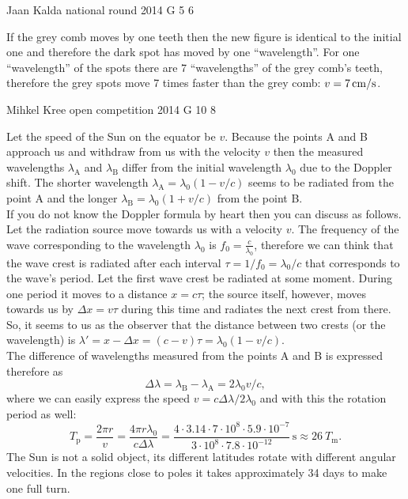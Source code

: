 \documentclass[11pt]{article}
\begin{document}
{Jaan Kalda} %
{national round} %
{2014} %
{G 5} %
{6} %
{

\ifEngSolution
If the grey comb moves by one teeth then the new figure is identical to the initial one and therefore the dark spot has moved by one “wavelength”. For one “wavelength” of the spots there are 7 “wavelengths” of the grey comb’s teeth, therefore the grey spots move 7 times faster than the grey comb: $v=\SI 7{cm/s}$.
\fi
}

{Mihkel Kree} %
{open competition} %
{2014} %
{G 10} %
{8} %
{

\ifEngSolution
Let the speed of the Sun on the equator be $v$. Because the points A and B approach us and withdraw from us with the velocity $v$ then the measured wavelengths $\lambda_\text{A}$ and $\lambda_\text{B}$ differ from the initial wavelength $\lambda_0$ due to the Doppler shift. The shorter wavelength $\lambda_\text{A}=\lambda_0(1-v/c)$ seems to be radiated from the point A and the longer $\lambda_\text{B}=\lambda_0(1+v/c)$ from the point B.\\
If you do not know the Doppler formula by heart then you can discuss as follows. Let the radiation source move towards us with a velocity $v$. The frequency of the wave corresponding to the wavelength $\lambda_0$ is $f_0=\frac{c}{\lambda_0}$, therefore we can think that the wave crest is radiated after each interval $\tau = 1/f_0 = \lambda_0/c$ that corresponds to the wave’s period. Let the first wave crest be radiated at some moment. During one period it moves to a distance $x=c\tau$; the source itself, however, moves towards us by $\Delta x = v\tau$ during this time and radiates the next crest from there. So, it seems to us as the observer that the distance between two crests (or the wavelength) is $\lambda'=x-\Delta x=(c-v)\tau = \lambda_0(1-v/c)$.\\
The difference of wavelengths measured from the points A and B is expressed therefore as
\[
\Delta\lambda = \lambda_\text{B}-\lambda_\text{A} = 2\lambda_0 v/c,
\]
where we can easily express the speed $v=c\Delta\lambda/2\lambda_0$ and with this the rotation period as well:
\[
T_\text{p}=\frac{2\pi r}{v}=\frac{4 \pi r \lambda_0}{c\Delta \lambda}=
\frac{4 \cdot 3.14 \cdot 7\cdot 10^8 \cdot 5.9 \cdot 10^{-7}}{3\cdot 10^8\cdot 7.8\cdot 10^{-12}}\,\text{s}\approx \SI{26}{\textit{T}_\text{m}}.
\]
The Sun is not a solid object, its different latitudes rotate with different angular velocities. In the regions close to poles it takes approximately 34 days to make one full turn.
\fi
}
\end{document}
